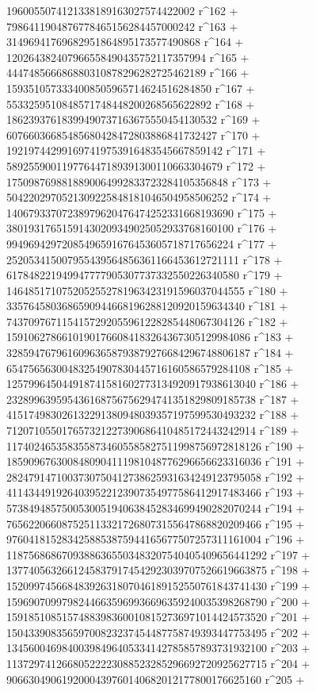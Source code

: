        1960055074121338189163027574422002 r^162 + 
       7986411904876778465156284457000242 r^163 + 
       31496941769682951864895173577490868 r^164 + 
       120264382407966558490435752117357994 r^165 + 
       444748566686880310878296282725462189 r^166 + 
       1593510573334008505965714624516284850 r^167 + 
       5533259510848571748448200268565622892 r^168 + 
       18623937618399490737163675550454130532 r^169 + 
       60766036685485680428472803886841732427 r^170 + 
       192197442991697419753916483545667859142 r^171 + 
       589255900119776447189391300110663304679 r^172 + 
       1750987698818890064992833723284105356848 r^173 + 
       5042202970521309225848181046504958506252 r^174 + 
       14067933707238979620476474252331668193690 r^175 + 
       38019317651591430209349025052933768160100 r^176 + 
       99496942972085496591676453605718717656224 r^177 + 
       252053415007955439564856361166453612721111 r^178 + 
       617848221949947777905307737332550226340580 r^179 + 
       1464851710752052552781963423191596037044555 r^180 + 
       3357645803686590944668196288120920159634340 r^181 + 
       7437097671154157292055961228285448067304126 r^182 + 
       15910627866101901766084183264367305129984086 r^183 + 
       32859476796160963658793879276684296748806187 r^184 + 
       65475656300483254907830445716160586579284108 r^185 + 
       125799645044918741581602773134920917938613040 r^186 + 
       232899639595436168756756294741351829809185738 r^187 + 
       415174983026132291380948039357197599530493232 r^188 + 
       712071055017657321227390686410485172443242914 r^189 + 
       1174024653583558734605585827511998756972818126 r^190 + 
       1859096763008480904111981048776296656623316036 r^191 + 
       2824791471003730750412738625931634249123795058 r^192 + 
       4114344919264039522123907354977586412917483466 r^193 + 
       5738494857500530051940638452834699490282070244 r^194 + 
       7656220660875251133217268073155647868820209466 r^195 + 
       9760418152834258853875944165677507257311161004 r^196 + 
       11875686867093886365503483207540405409656441292 r^197 + 
       13774056326612458379174542923039707526619663875 r^198 + 
       15209974566848392631807046189152550761843741430 r^199 + 
       15969070997982446635969936696359240035398268790 r^200 + 
       15918510851574883983600108152736971014424573520 r^201 + 
       15043390835659700823237454487758749393447753495 r^202 + 
       13456004698400398496405334142785857893731932100 r^203 + 
       11372974126680522223088523285296692720925627715 r^204 + 
       9066304906192000439760140682012177800176625160 r^205 + 
